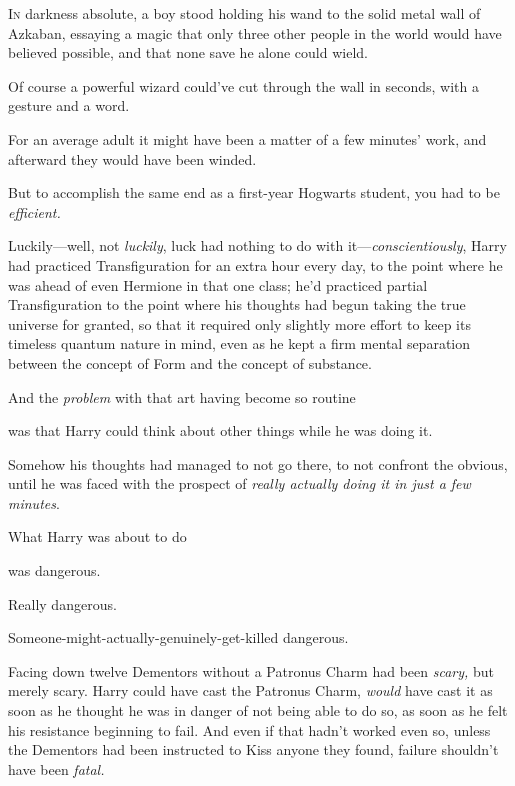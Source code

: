
\lettrine{I}{n} darkness absolute, a boy stood holding his wand to the solid metal wall of
Azkaban, essaying a magic that only three other people in the world would have
believed possible, and that none save he alone could wield.

Of course a powerful wizard could've cut through the wall in seconds, with a
gesture and a word.

For an average adult it might have been a matter of a few minutes' work, and
afterward they would have been winded.

But to accomplish the same end as a first-year Hogwarts student, you had to be
\emph{efficient.}

Luckily---well, not \emph{luckily}, luck had nothing to do with
it---\emph{conscientiously}, Harry had practiced Transfiguration for an extra
hour every day, to the point where he was ahead of even Hermione in that one
class; he'd practiced partial Transfiguration to the point where his thoughts
had begun taking the true universe for granted, so that it required only
slightly more effort to keep its timeless quantum nature in mind, even as he
kept a firm mental separation between the concept of Form and the concept of
substance.

And the \emph{problem} with that art having become so routine{\el}

{\el} was that Harry could think about other things while he was doing it.

Somehow his thoughts had managed to not go there, to not confront the obvious,
until he was faced with the prospect of \emph{really actually doing it in just
a few minutes}.

What Harry was about to do{\el}

{\el} was dangerous.

Really dangerous.

Someone-might-actually-genuinely-get-killed dangerous.

Facing down twelve Dementors without a Patronus Charm had been \emph{scary,}
but merely scary. Harry could have cast the Patronus Charm, \emph{would} have
cast it as soon as he thought he was in danger of not being able to do so, as
soon as he felt his resistance beginning to fail. And even if that hadn't
worked{\el} even so, unless the Dementors had been instructed to Kiss anyone
they found, failure shouldn't have been \emph{fatal.}

